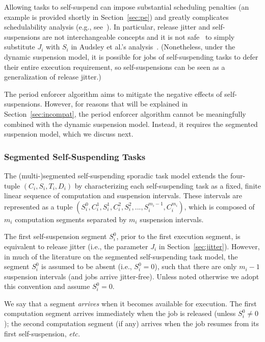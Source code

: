 Allowing tasks to self-suspend can impose substantial scheduling penalties (an example is provided shortly in Section~\ref{sec:pe}) and greatly complicates  schedulability analysis (e.g., see~\cite{ecrts15nelissen,Ri:04,Chen2016}). In particular, release jitter and self-suspensions are not interchangeable concepts and it is not safe~\cite{Chen2016,ecrts15nelissen} to simply substitute $J_i$ with $S_i$ in Audsley et al.'s analysis~\cite{ABRTW:93}. (Nonetheless, under the dynamic suspension model, it is possible for jobs of self-suspending tasks to defer their entire execution requirement, so self-suspensions can be seen as a generalization of release jitter.)

The period enforcer algorithm aims to mitigate the negative effects of self-suspensions. However, for reasons that will be explained in Section~\ref{sec:incompat}, the period enforcer algorithm cannot be meaningfully combined with the dynamic suspension model. Instead, it requires the segmented suspension model, which we discuss next.


\subsubsection{Segmented Self-Suspending Tasks}
\label{sec:segmented}

The (multi-)segmented self-suspending sporadic task model extends the  four-tuple $(C_i,S_i,T_i,D_i)$ by characterizing each self-suspending task as a fixed, finite linear sequence of computation and suspension intervals. These intervals are represented as a tuple
$(S_{i}^0,C_{i}^1,S_{i}^1,C_{i}^2,S_{i}^2,...,S_{i}^{m_i-1},C_{i}^{m_i})$, which is composed of $m_i$ computation segments separated by $m_i$ suspension intervals.

The first self-suspension segment $S_i^0$, prior to the first execution segment, is equivalent to release jitter (i.e., the parameter $J_i$ in Section~\ref{sec:jitter}). However, in much of the literature on the segmented self-suspending task model, the segment $S_i^0$ is assumed to be absent (i.e., $S_i^0 = 0$), such that there are only $m_i - 1$ suspension intervals (and jobs arrive jitter-free). Unless noted otherwise we adopt this convention and assume $S_i^0 = 0$.

We say that a segment \emph{arrives} when it becomes available for execution. The first computation segment arrives immediately when the job is released (unless $S_i^0 \neq 0$); the second computation segment (if any) arrives when the job resumes from its first self-suspension, \textit{etc.}


